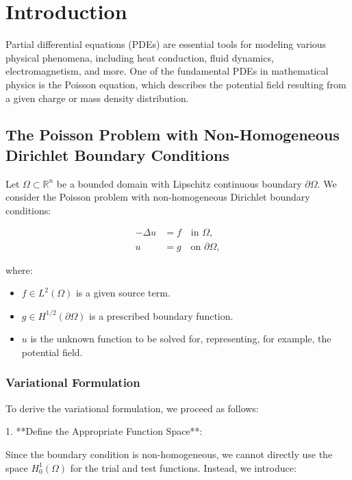 \documentclass[class=article, crop=false]{standalone}
\begin{document}
\newpage
\section{Introduction}

Partial differential equations (PDEs) are essential tools for modeling various physical phenomena, including heat conduction, fluid dynamics, electromagnetism, and more. One of the fundamental PDEs in mathematical physics is the Poisson equation, which describes the potential field resulting from a given charge or mass density distribution.

\subsection{The Poisson Problem with Non-Homogeneous Dirichlet Boundary Conditions}

Let $\Omega \subset \mathbb{R}^n$ be a bounded domain with Lipschitz continuous boundary $\partial \Omega$. We consider the Poisson problem with non-homogeneous Dirichlet boundary conditions:

\begin{align}
    -\Delta u &= f \quad \text{in } \Omega, \label{eq:poisson}\\
    u &= g \quad \text{on } \partial \Omega, \label{eq:dirichlet}
\end{align}

where:

\begin{itemize}
    \item $f \in L^2(\Omega)$ is a given source term.
    \item $g \in H^{1/2}(\partial \Omega)$ is a prescribed boundary function.
    \item $u$ is the unknown function to be solved for, representing, for example, the potential field.
\end{itemize}

\subsubsection{Variational Formulation}

To derive the variational formulation, we proceed as follows:

1. **Define the Appropriate Function Space**:

   Since the boundary condition is non-homogeneous, we cannot directly use the space $H_0^1(\Omega)$ for the trial and test functions. Instead, we introduce:
\end{document}
